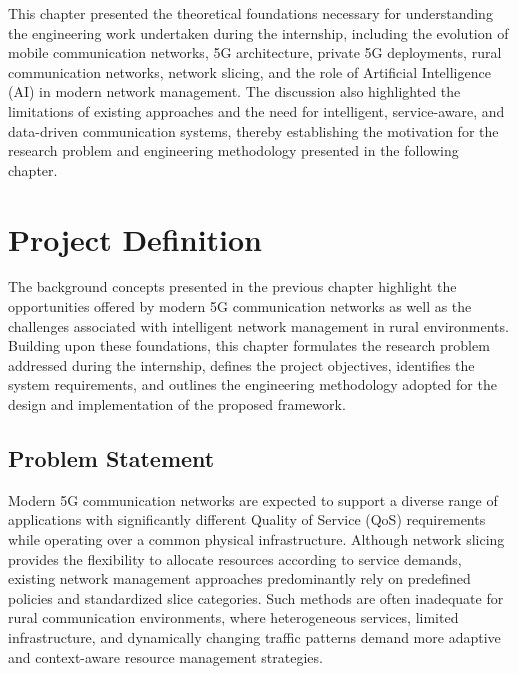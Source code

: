 \documentclass[12pt,a4paper]{report}
\begin{document}
	This chapter presented the theoretical foundations necessary for understanding the engineering work undertaken during the internship, including the evolution of mobile communication networks, 5G architecture, private 5G deployments, rural communication networks, network slicing, and the role of Artificial Intelligence (AI) in modern network management. The discussion also highlighted the limitations of existing approaches and the need for intelligent, service-aware, and data-driven communication systems, thereby establishing the motivation for the research problem and engineering methodology presented in the following chapter.
	
	
	
	\chapter{Project Definition}
	\label{chap:problem_statement}
	
	The background concepts presented in the previous chapter highlight the opportunities offered by modern 5G communication networks as well as the challenges associated with intelligent network management in rural environments. Building upon these foundations, this chapter formulates the research problem addressed during the internship, defines the project objectives, identifies the system requirements, and outlines the engineering methodology adopted for the design and implementation of the proposed framework.
	
	\section{Problem Statement}
	\label{sec:problem_statement}
	
	Modern 5G communication networks are expected to support a diverse range of applications with significantly different Quality of Service (QoS) requirements while operating over a common physical infrastructure. Although network slicing provides the flexibility to allocate resources according to service demands, existing network management approaches predominantly rely on predefined policies and standardized slice categories. Such methods are often inadequate for rural communication environments, where heterogeneous services, limited infrastructure, and dynamically changing traffic patterns demand more adaptive and context-aware resource management strategies.
	
\end{document}
